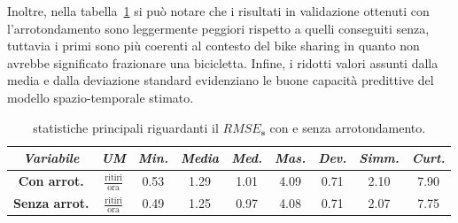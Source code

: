 Inoltre, nella tabella~\ref{statistiche_RMSE_s} si può notare che i risultati in validazione ottenuti con l'arrotondamento sono leggermente peggiori rispetto a quelli conseguiti senza, tuttavia i primi sono più coerenti al contesto del bike sharing in quanto non avrebbe significato frazionare una bicicletta. Infine, i ridotti valori assunti dalla media e dalla deviazione standard evidenziano le buone capacità predittive del modello spazio-temporale stimato.

\begin{table}[htpb]
	\centering
	\renewcommand\arraystretch{1.5}
	\begin{tabular}{c|c|c|c|c|c|c|c|c}
		\hline
		\textit{Variabile} & \textit{UM} & \textit{Min.} & \textit{Media} & \textit{Med.} & \textit{Mas.} & \textit{Dev.} & \textit{Simm.}  & \textit{Curt.} \\
		\hline
		\textbf{Con arrot.} & $\frac{\text{ritiri}}{\text{ora}}$ & \num{0.53} & \num{1.29} & \num{1.01} & \num{4.09} & \num{0.71} & \num{2.10} & \num{7.90} \\
		\hline
		\textbf{Senza arrot.} & $\frac{\text{ritiri}}{\text{ora}}$ & \num{0.49} & \num{1.25} & \num{0.97} & \num{4.08} & \num{0.71} & \num{2.07} & \num{7.75} \\
		\hline
	\end{tabular}
	\caption[Statistiche principali riguardanti il $RMSE_\mathbf{s}$ con e senza arrotondamento]{statistiche principali riguardanti il $RMSE_\mathbf{s}$ con e senza arrotondamento.}
	\label{statistiche_RMSE_s}
\end{table} 

